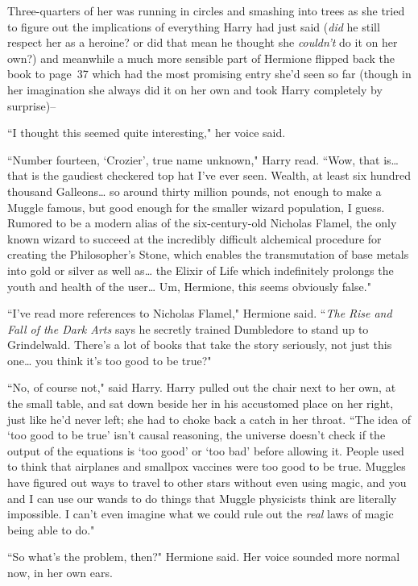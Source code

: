 Three-quarters of her was running in circles and smashing into trees as she tried to figure out the implications of everything Harry had just said (\emph{did} he still respect her as a heroine? or did that mean he thought she \emph{couldn't} do it on her own?) and meanwhile a much more sensible part of Hermione flipped back the book to page~37 which had the most promising entry she'd seen so far (though in her imagination she always did it on her own and took Harry completely by surprise)\---

``I thought this seemed quite interesting," her voice said.

``Number fourteen, `Crozier', true name unknown," Harry read. ``Wow, that is{\ldots} that is the gaudiest checkered top hat I've ever seen. Wealth, at least six hundred thousand Galleons{\ldots} so around thirty million pounds, not enough to make a Muggle famous, but good enough for the smaller wizard population, I guess. Rumored to be a modern alias of the six-century-old Nicholas Flamel, the only known wizard to succeed at the incredibly difficult alchemical procedure for creating the Philosopher's Stone, which enables the transmutation of base metals into gold or silver as well as{\ldots} the Elixir of Life which indefinitely prolongs the youth and health of the user{\ldots} Um, Hermione, this seems obviously false."

``I've read more references to Nicholas Flamel," Hermione said. ``\emph{The Rise and Fall of the Dark Arts} says he secretly trained Dumbledore to stand up to Grindelwald. There's a lot of books that take the story seriously, not just this one{\ldots} you think it's too good to be true?"

``No, of course not," said Harry. Harry pulled out the chair next to her own, at the small table, and sat down beside her in his accustomed place on her right, just like he'd never left; she had to choke back a catch in her throat. ``The idea of `too good to be true' isn't causal reasoning, the universe doesn't check if the output of the equations is `too good' or `too bad' before allowing it. People used to think that airplanes and smallpox vaccines were too good to be true. Muggles have figured out ways to travel to other stars without even using magic, and you and I can use our wands to do things that Muggle physicists think are literally impossible. I can't even imagine what we could rule out the \emph{real} laws of magic being able to do."

``So what's the problem, then?" Hermione said. Her voice sounded more normal now, in her own ears.

